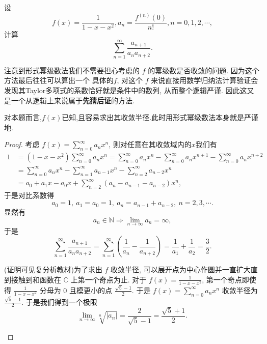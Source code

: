 \documentclass[../../main.tex]{subfiles}
\begin{document}
\begin{example}
设
\[
f(x)=\frac{1}{1 - x - x^2}, a_n=\frac{f^{(n)}(0)}{n!}, n = 0,1,2,\cdots,
\]
计算
\[
\sum_{n = 1}^{\infty}\frac{a_{n + 1}}{a_n a_{n + 2}}.
\]
\end{example}
\begin{note}
注意到形式幂级数法我们不需要担心考虑的 \( f \) 的幂级数是否收敛的问题. 因为这个方法最后往往可以算出一个 具体的\( f \), 对这个 \( f \) 来说直接用数学归纳法计算验证会发现其Taylor多项式的系数恰好就是条件中的数列, 从而整个逻辑严谨. 因此这又是一个从逻辑上来说属于\textbf{先猜后证}的方法.

对本题而言,$f(x)$已知,且容易求出其收敛半径.此时用形式幂级数法本身就是严谨地.
\end{note}
\begin{proof}
考虑 \( f(x)=\sum_{n = 0}^{\infty}a_n x^n \), 则对任意在其收敛域内的$x$我们有
\begin{align}
1&=(1 - x - x^2)\sum_{n = 0}^{\infty}a_n x^n=\sum_{n = 0}^{\infty}a_n x^n-\sum_{n = 0}^{\infty}a_n x^{n + 1}-\sum_{n = 0}^{\infty}a_n x^{n + 2}\nonumber \\
&=\sum_{n = 0}^{\infty}a_n x^n-\sum_{n = 1}^{\infty}a_{n - 1}x^n-\sum_{n = 2}^{\infty}a_{n - 2}x^n\nonumber \\
&=a_0 + a_1 x - a_0 x + \sum_{n = 2}^{\infty}(a_n - a_{n - 1} - a_{n - 2})x^n,\nonumber
\end{align}
于是对比系数得
\[
a_0 = 1,\ a_1 = a_0 = 1,\ a_n = a_{n - 1} + a_{n - 2},\ n = 2,3,\cdots. \label{eq:1}
\]
显然有
\[
a_n\in\mathbb{N}\Rightarrow\lim_{n\rightarrow\infty}a_n=\infty,
\]
于是
\[
\sum_{n = 1}^{\infty}\frac{a_{n + 1}}{a_n a_{n + 2}}=\sum_{n = 1}^{\infty}\left(\frac{1}{a_n}-\frac{1}{a_{n + 2}}\right)=\frac{1}{a_1}+\frac{1}{a_2}=\frac{3}{2}.
\]
\begin{remark}
(证明可见复分析教材)为了求出 \( f \) 收敛半径, 可以展开点为中心作圆并一直扩大直到接触到和函数在 \( \mathbb{C} \) 上第一个奇点为止. 对于 \( f(x)=\frac{1}{1 - x - x^2} \), 第一个奇点即使得 \( \frac{1}{1 - x - x^2} \) 分母为 0 且模更小的点 \( \frac{\sqrt{5}-1}{2} \). 于是 \( f(x)=\sum_{n = 0}^{\infty}a_n x^n \) 收敛半径为 \( \frac{\sqrt{5}-1}{2} \). 于是我们得到一个极限
\[
\lim_{n\rightarrow\infty}\sqrt[n]{|a_n|}=\frac{2}{\sqrt{5}-1}=\frac{\sqrt{5}+1}{2}.
\]
\end{remark}

\end{proof}
\end{document}
